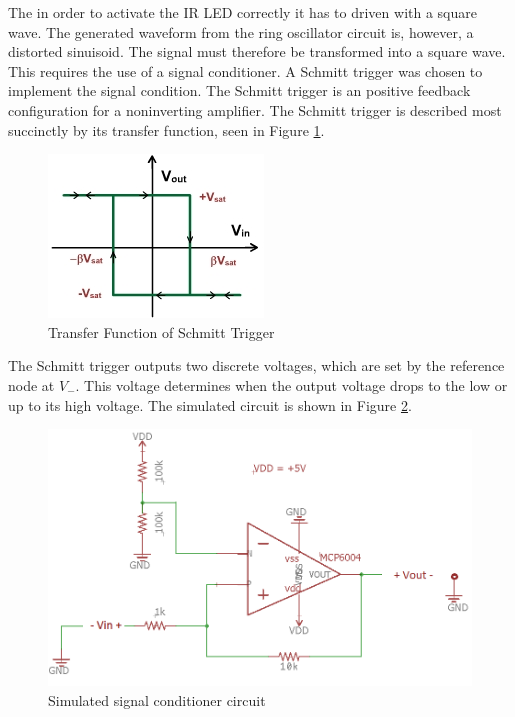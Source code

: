 
The in order to activate the IR LED correctly it has to driven with a square wave. The generated waveform from the ring oscillator circuit is, however, a distorted sinuisoid. The signal must therefore be transformed into a square wave. This requires the use of a signal conditioner. A Schmitt trigger was chosen to implement the signal condition. 
The Schmitt trigger is an positive feedback configuration for a noninverting amplifier. The Schmitt trigger is described most succinctly by its transfer function, seen in Figure \ref{fig:schmitttransfer}.

\begin{figure}[H]
	\centering
	\includegraphics[width=0.6\linewidth]{schmitttransfer}
	\caption[Transfer function of Schmitt Trigger]{Transfer Function of Schmitt Trigger \cite{schmitt}}
	\label{fig:schmitttransfer}
\end{figure}
The Schmitt trigger outputs two discrete voltages, which are set by the reference node at $V_-$. This voltage determines when the output voltage drops to the low or up to its high voltage. The simulated circuit is shown in Figure \ref{fig:signalconditionersimulationschem}.

\begin{figure}[H]
	\centering
	\includegraphics[width=0.6\linewidth]{SignalConditionerSimulationSchem}
	\caption[Simulated signal conditioner circuit]{Simulated signal conditioner circuit}
	\label{fig:signalconditionersimulationschem}
\end{figure}

